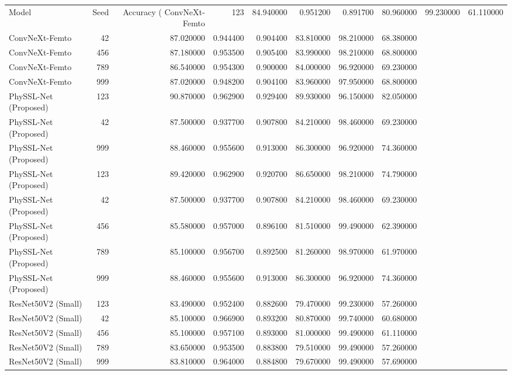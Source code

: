 \begin{tabular}{lrrrrrrr}
\toprule
Model & Seed & Accuracy (%
\midrule
ConvNeXt-Femto & 123 & 84.940000 & 0.951200 & 0.891700 & 80.960000 & 99.230000 & 61.110000 \\
ConvNeXt-Femto & 42 & 87.020000 & 0.944400 & 0.904400 & 83.810000 & 98.210000 & 68.380000 \\
ConvNeXt-Femto & 456 & 87.180000 & 0.953500 & 0.905400 & 83.990000 & 98.210000 & 68.800000 \\
ConvNeXt-Femto & 789 & 86.540000 & 0.954300 & 0.900000 & 84.000000 & 96.920000 & 69.230000 \\
ConvNeXt-Femto & 999 & 87.020000 & 0.948200 & 0.904100 & 83.960000 & 97.950000 & 68.800000 \\
PhySSL-Net (Proposed) & 123 & 90.870000 & 0.962900 & 0.929400 & 89.930000 & 96.150000 & 82.050000 \\
PhySSL-Net (Proposed) & 42 & 87.500000 & 0.937700 & 0.907800 & 84.210000 & 98.460000 & 69.230000 \\
PhySSL-Net (Proposed) & 999 & 88.460000 & 0.955600 & 0.913000 & 86.300000 & 96.920000 & 74.360000 \\
PhySSL-Net (Proposed) & 123 & 89.420000 & 0.962900 & 0.920700 & 86.650000 & 98.210000 & 74.790000 \\
PhySSL-Net (Proposed) & 42 & 87.500000 & 0.937700 & 0.907800 & 84.210000 & 98.460000 & 69.230000 \\
PhySSL-Net (Proposed) & 456 & 85.580000 & 0.957000 & 0.896100 & 81.510000 & 99.490000 & 62.390000 \\
PhySSL-Net (Proposed) & 789 & 85.100000 & 0.956700 & 0.892500 & 81.260000 & 98.970000 & 61.970000 \\
PhySSL-Net (Proposed) & 999 & 88.460000 & 0.955600 & 0.913000 & 86.300000 & 96.920000 & 74.360000 \\
ResNet50V2 (Small) & 123 & 83.490000 & 0.952400 & 0.882600 & 79.470000 & 99.230000 & 57.260000 \\
ResNet50V2 (Small) & 42 & 85.100000 & 0.966900 & 0.893200 & 80.870000 & 99.740000 & 60.680000 \\
ResNet50V2 (Small) & 456 & 85.100000 & 0.957100 & 0.893000 & 81.000000 & 99.490000 & 61.110000 \\
ResNet50V2 (Small) & 789 & 83.650000 & 0.953500 & 0.883800 & 79.510000 & 99.490000 & 57.260000 \\
ResNet50V2 (Small) & 999 & 83.810000 & 0.964000 & 0.884800 & 79.670000 & 99.490000 & 57.690000 \\

\end{tabular}
